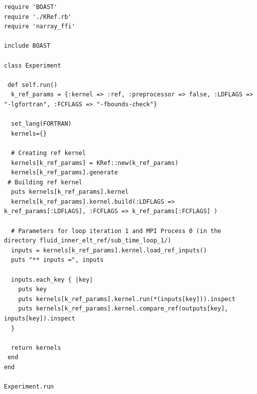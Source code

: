 \documentclass[10pt,twoside]{article}   	%
\begin{document}
\begin{lstlisting}[caption=run\_ref.rb]
require 'BOAST'
require './KRef.rb'
require 'narray_ffi'

include BOAST

class Experiment

 def self.run()
  k_ref_params = {:kernel => :ref, :preprocessor => false, :LDFLAGS => "-lgfortran", :FCFLAGS => "-fbounds-check"}

  set_lang(FORTRAN)
  kernels={}

  # Creating ref kernel
  kernels[k_ref_params] = KRef::new(k_ref_params)
  kernels[k_ref_params].generate
 # Building ref kernel
  puts kernels[k_ref_params].kernel
  kernels[k_ref_params].kernel.build(:LDFLAGS => k_ref_params[:LDFLAGS], :FCFLAGS => k_ref_params[:FCFLAGS] )

  # Parameters for loop iteration 1 and MPI Process 0 (in the directory fluid_inner_elt_ref/sub_time_loop_1/)
  inputs = kernels[k_ref_params].kernel.load_ref_inputs()
  puts "** inputs =", inputs

  inputs.each_key { |key|
    puts key
    puts kernels[k_ref_params].kernel.run(*(inputs[key])).inspect
    puts kernels[k_ref_params].kernel.compare_ref(outputs[key], inputs[key]).inspect
  }

  return kernels
 end
end

Experiment.run
\end{lstlisting}
\end{document}
